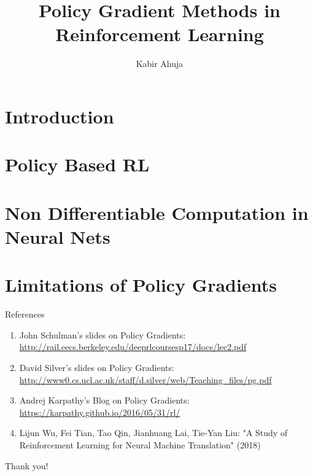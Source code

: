 \documentclass[11pt]{beamer}
\title[Policy Gradient Methods]{Policy Gradient Methods in Reinforcement Learning}
\author[Kabir Ahuja]{
Kabir Ahuja}
\begin{document}


\section{Introduction} 


\section{Policy Based RL}


\section{Non Differentiable Computation in Neural Nets}


\section{Limitations of Policy Gradients}





\nocite{*}
\begin{frame}{References}
\begin{enumerate}
    \item John Schulman's slides on Policy Gradients: \href{http://rail.eecs.berkeley.edu/deeprlcoursesp17/docs/lec2.pdf}{http://rail.eecs.berkeley.edu/deeprlcoursesp17/docs/lec2.pdf}
    \item David Silver's slides on Policy Gradients: \href{http://www0.cs.ucl.ac.uk/staff/d.silver/web/Teaching_files/pg.pdf}{http://www0.cs.ucl.ac.uk/staff/d.silver/web/Teaching\_files/pg.pdf}
    \item Andrej Karpathy's Blog on Policy Gradients: \href{https://karpathy.github.io/2016/05/31/rl/}{https://karpathy.github.io/2016/05/31/rl/}
    \item Lijun Wu, Fei Tian, Tao Qin, Jianhuang Lai, Tie-Yan Liu: "A Study of Reinforcement Learning for Neural Machine Translation" (2018)
\end{enumerate}
\end{frame}

\begin{frame}{}
\begin{center}
\Huge Thank you!
\end{center}
\end{frame}
\end{document}
